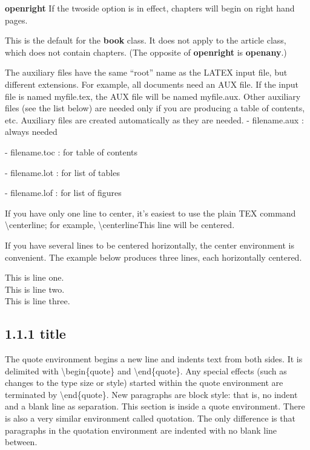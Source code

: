 \documentclass[12pt,openright]{book}
\begin{document}
\textbf{openright} If the twoside option is in effect, chapters will begin on right hand pages.

This is the default for the \textbf{book} class. It does not apply to the article class, which does not contain chapters. (The opposite of \textbf{openright} is \textbf{openany}.)

\vskip 0.1in
The auxiliary files have the same “root” name as the LATEX input file, but different
extensions. For example, all documents need an AUX file. If the input file is named
myfile.tex, the AUX file will be named myfile.aux. Other auxiliary files (see the list
below) are needed only if you are producing a table of contents, etc. Auxiliary files are
created automatically as they are needed.
\vskip 0.1in
- filename.aux : always needed

- filename.toc : for table of contents

- filename.lot : for list of tables

- filename.lof : for list of figures

\vskip 0.1in
If you have only one line to center, it’s easiest to use the plain TEX command
\textbackslash centerline; for example,
\textbackslash centerline{This line will be centered}.

If you have several lines to be centered horizontally, the center environment is convenient. The example below produces three lines, each horizontally centered.

\begin{center}
  This is line one. \\
  This is line two. \\
  This is line three.
\end{center}

\subsection{1.1.1 title}

The quote environment begins a new line and indents text from both sides. It is delimited with \textbackslash begin\{quote\} and \textbackslash end\{quote\}. Any special effects (such as changes to the type size or style) started within the quote environment
are terminated by \textbackslash end\{quote\}. New paragraphs are block style: that is, no indent and a blank line as separation. This section is inside a quote environment. There is also a very similar environment called quotation. The only difference is that paragraphs in the quotation environment are indented with no blank line between.
\end{document}
